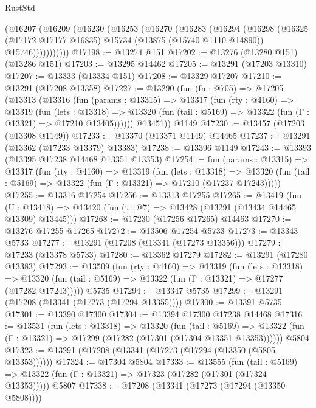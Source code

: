 \begin{lexlean}{RustStd}
\begin{coremodule}
        (@16207
          (@16209
            (@16230
              (@16253
                (@16270
                  (@16283
                    (@16294
                      (@16298
                        (@16325
                          (@17172 @17177 @16835)
                          @15734
                          (@13875 (@15740 @1110 @14890))
                          @15746)))))))))))
@17198 := @13274 @151
@17202 := @13276 (@13280 @151) (@13286 @151)
@17203 := @13295 @14462
@17205 := @13291 (@17203 @13310)
@17207 := @13333 (@13334 @151)
@17208 := @13329 @17207
@17210 := @13291 (@17208 @13358)
@17227 := @13290
    (fun (fn : @705) =>
    @17205
      (@13313
        (@13316
          (fun (params : @13315) =>
          @13317
            (fun (rty : @4160) =>
            @13319
              (fun (lets : @13318) =>
              @13320 (fun (tail : @5169) => @13322 (fun (Γ : @13321) => @17210 @13405))))))
        @13451))
    @1149
@17230 := @13457 (@17203 (@13308 @1149))
@17233 := @13370 (@13371 @1149) @14465
@17237 := @13291 (@13362 (@17233 @13379) @13383)
@17238 := @13396 @1149
@17243 := @13393 (@13395 @17238 @14468 @13351 @13353)
@17254 := fun (params : @13315) =>
  @13317
    (fun (rty : @4160) =>
    @13319
      (fun (lets : @13318) =>
      @13320 (fun (tail : @5169) => @13322 (fun (Γ : @13321) => @17210 (@17237 @17243)))))
@17255 := @13316 @17254
@17256 := @13313 @17255
@17265 := @13419
    (fun (U : @13418) => @13420 (fun (t : @7) => @13428 (@13291 (@13434 @14465 @13309) @13445)))
@17268 := @17230 (@17256 @17265) @14463
@17270 := @13276 @17255 @17265
@17272 := @13506 @17254 @5733
@17273 := @13343 @5733
@17277 := @13291 (@17208 (@13341 (@17273 @13356)))
@17279 := @17233 (@13378 @5733)
@17280 := @13362 @17279
@17282 := @13291 (@17280 @13383)
@17293 := @13509
    (fun (rty : @4160) =>
    @13319
      (fun (lets : @13318) =>
      @13320 (fun (tail : @5169) => @13322 (fun (Γ : @13321) => @17277 (@17282 @17243)))))
    @5735
@17294 := @13347 @5735
@17299 := @13291 (@17208 (@13341 (@17273 (@17294 @13355))))
@17300 := @13391 @5735
@17301 := @13390 @17300
@17304 := @13394 @17300 @17238 @14468
@17316 := @13531
    (fun (lets : @13318) =>
    @13320
      (fun (tail : @5169) =>
      @13322 (fun (Γ : @13321) => @17299 (@17282 (@17301 (@17304 @13351 @13353))))))
    @5804
@17323 := @13291 (@17208 (@13341 (@17273 (@17294 (@13350 (@5805 @13353))))))
@17324 := @17304 @5804
@17333 := @13555
    (fun (tail : @5169) => @13322 (fun (Γ : @13321) => @17323 (@17282 (@17301 (@17324 @13353)))))
    @5807
@17338 := @17208 (@13341 (@17273 (@17294 (@13350 @5808))))

\end{coremodule}
\end{lexlean}
